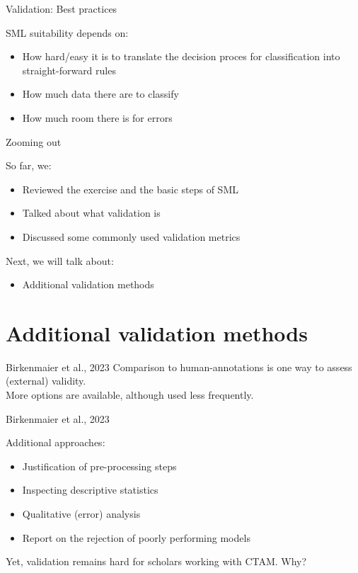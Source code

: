 \documentclass[compress]{beamer}
\begin{document}
\begin{frame}{Validation: Best practices}

\begin{alertblock}{SML suitability depends on:}
\begin{itemize}
	\item How hard/easy it is to translate the decision proces for classification into straight-forward rules
	\item How much data there are to classify
	\item How much room there is for errors 
\end{itemize}
\end{alertblock}
\end{frame}

\begin{frame}[fragile]{Zooming out} 
	
	\begin{alertblock}{So far, we:}
		\begin{itemize}
			\item Reviewed the exercise and the basic steps of SML
			\item Talked about what validation is
			\item Discussed some commonly used validation metrics
		\end{itemize}
	\end{alertblock}

	\begin{alertblock}{Next, we will talk about:}
		\begin{itemize}
			\item Additional validation methods
		\end{itemize}
	\end{alertblock}	
\end{frame}


\section{Additional validation methods}

\begin{frame}{Birkenmaier et al., 2023}
Comparison to human-annotations is one way to assess (external) validity. \\
More options are available, although used less frequently.
\end{frame}

\begin{frame}{Birkenmaier et al., 2023}
\begin{alertblock}{Additional approaches:}
	\begin{itemize}
		\item Justification of pre-processing steps
		\item Inspecting descriptive statistics
		\item Qualitative (error) analysis
		\item Report on the rejection of poorly performing models
	\end{itemize}
\end{alertblock}

Yet, validation remains hard for scholars working with CTAM. Why?
\end{frame}
\end{document}
